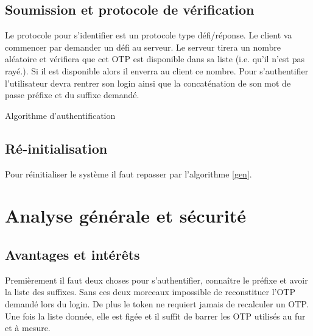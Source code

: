 \documentclass{../res/univ-projet}
\begin{document}
\subsection{Soumission et protocole de vérification}
        Le protocole pour s'identifier est un protocole type défi/réponse. Le client
    va commencer par demander un défi au serveur. Le serveur tirera un nombre aléatoire
    et vérifiera que cet OTP est disponible dans sa liste (i.e. qu'il n'est pas rayé.).
    Si il est disponible alors il enverra au client ce nombre. Pour s'authentifier l'utilisateur
    devra rentrer son login ainsi que la concaténation de son mot de passe préfixe et du suffixe
    demandé.

    \begin{algorithm}
        \begin{algorithmic}
            \ELSE
            \ENDIF
        \end{algorithmic}
        \caption{Algorithme d'authentification}
    \end{algorithm}


\subsection{Ré-initialisation}
        Pour réinitialiser le système il faut repasser par l'algorithme \ref{gen}.

\section{Analyse générale et sécurité}
\subsection{Avantages et intérêts}
        Premièrement il faut deux choses pour s'authentifier, connaître le préfixe et avoir
    la liste des suffixes. Sans ces deux morceaux impossible de reconstituer l'OTP
    demandé lors du login. De plus le \og token\fg{} ne requiert jamais de recalculer un
    OTP. Une fois la liste donnée, elle est figée et il suffit de barrer les OTP utilisés au
    fur et à mesure.
\end{document}
